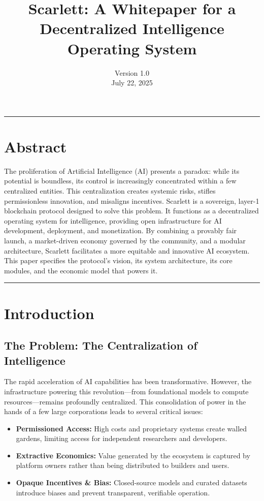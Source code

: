 \documentclass[10pt]{article}
\title{\textbf{Scarlett: A Whitepaper for a Decentralized Intelligence Operating System}}
\author{Version 1.0 \\ July 22, 2025}
\date{}
\begin{document}
\maketitle
\thispagestyle{fancy}

\tableofcontents
\newpage

\hrule
\vspace{1em}
\section*{Abstract}
The proliferation of Artificial Intelligence (AI) presents a paradox: while its potential is boundless, its control is increasingly concentrated within a few centralized entities. This centralization creates systemic risks, stifles permissionless innovation, and misaligns incentives. Scarlett is a sovereign, layer-1 blockchain protocol designed to solve this problem. It functions as a decentralized operating system for intelligence, providing open infrastructure for AI development, deployment, and monetization. By combining a provably fair launch, a market-driven economy governed by the community, and a modular architecture, Scarlett facilitates a more equitable and innovative AI ecosystem. This paper specifies the protocol's vision, its system architecture, its core modules, and the economic model that powers it.
\vspace{1em}
\hrule

\newpage

\section{Introduction}

\subsection{The Problem: The Centralization of Intelligence}
The rapid acceleration of AI capabilities has been transformative. However, the infrastructure powering this revolution—from foundational models to compute resources—remains profoundly centralized. This consolidation of power in the hands of a few large corporations leads to several critical issues:
\begin{itemize}[leftmargin=*, itemsep=2pt]
    \item \textbf{Permissioned Access:} High costs and proprietary systems create walled gardens, limiting access for independent researchers and developers.
    \item \textbf{Extractive Economics:} Value generated by the ecosystem is captured by platform owners rather than being distributed to builders and users.
    \item \textbf{Opaque Incentives \& Bias:} Closed-source models and curated datasets introduce biases and prevent transparent, verifiable operation.
\end{itemize}
\end{document}
